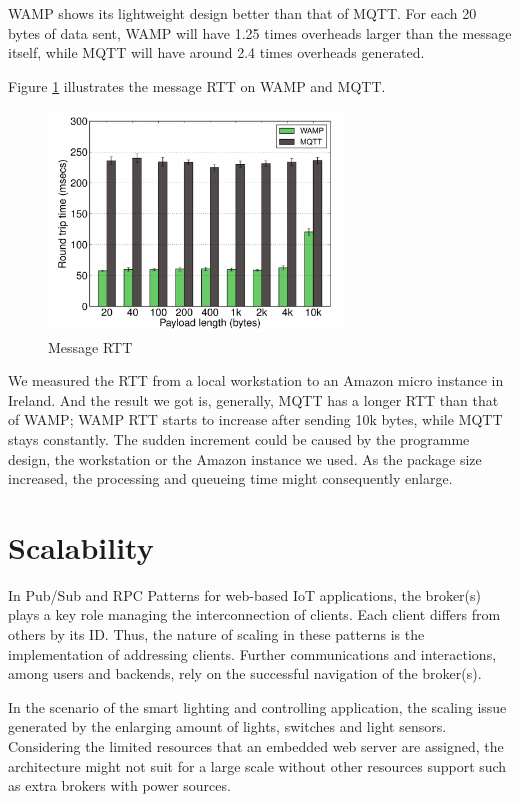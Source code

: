 WAMP shows its lightweight design better than that of MQTT. For each 20 bytes of data sent, WAMP will have 1.25 times overheads larger than the message itself, while MQTT will have around 2.4 times overheads generated. 

Figure \ref{fig:rtt} illustrates the message RTT on WAMP and MQTT.

\begin{figure}[t]
  \begin{center}
    \includegraphics[width=0.7\textwidth]{images/rtt.pdf}
    \caption{Message RTT}
    \label{fig:rtt}
  \end{center}
\end{figure}

We measured the RTT from a local workstation to an Amazon micro instance in Ireland. And the result we got is, generally, MQTT has a longer RTT than that of WAMP; WAMP RTT starts to increase after sending 10k bytes, while MQTT stays constantly. The sudden increment could be caused by the programme design, the workstation or the Amazon instance we used. As the package size increased, the processing and queueing time might consequently enlarge. 

\section{Scalability}
In Pub/Sub and RPC Patterns for web-based IoT applications, the broker(s) plays a key role managing the interconnection of clients. Each client differs from others by its ID. Thus, the nature of scaling in these patterns is the implementation of addressing clients. Further communications and interactions, among users and backends, rely on the successful navigation of the broker(s).

In the scenario of the smart lighting and controlling application, the scaling issue generated by the enlarging amount of lights, switches and light sensors. Considering the limited resources that an embedded web server are assigned, the architecture might not suit for a large scale without other resources support such as extra brokers with power sources.

